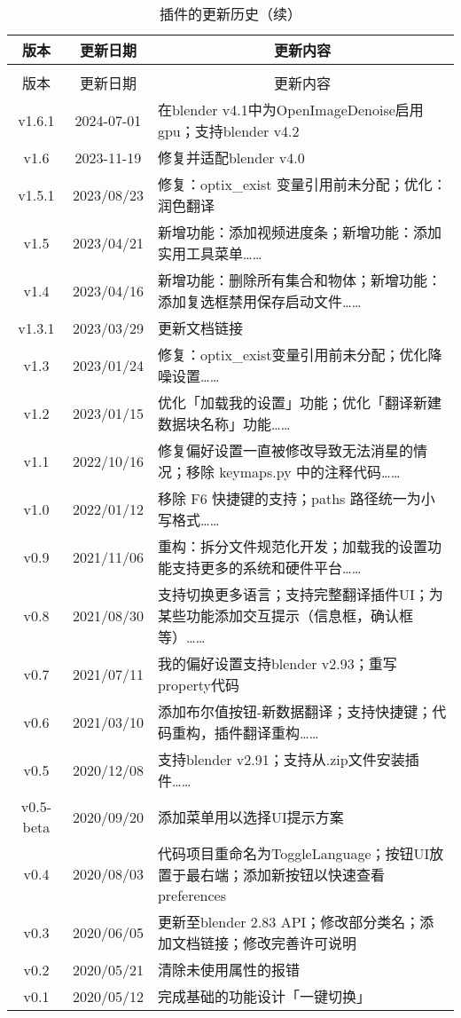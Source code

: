\documentclass{../../public_resources/doc}
\begin{document}
\begin{longtable}{|*{2}{c|}m{300pt}|}
    \caption{插件的更新历史}\label{更新历史} \\
    \hline
    版本 & 更新日期 & \multicolumn{1}{c|}{更新内容} \\
    \hline
    \endfirsthead

    \caption{插件的更新历史（续）} \\
    \hline
    版本 & 更新日期 & \multicolumn{1}{c|}{更新内容} \\
    \hline
    \endhead

    v1.6.1 & 2024-07-01 & 在blender v4.1中为OpenImageDenoise启用gpu；支持blender v4.2\\
    \hline
    v1.6 & 2023-11-19 & 修复并适配blender v4.0 \\
    \hline
    v1.5.1 & 2023/08/23 & 修复：optix\_exist 变量引用前未分配；优化：润色翻译 \\
    \hline
    v1.5 & 2023/04/21 & 新增功能：添加视频进度条；新增功能：添加实用工具菜单…… \\
    \hline
    v1.4 & 2023/04/16 & 新增功能：删除所有集合和物体；新增功能：添加复选框禁用保存启动文件……\\
    \hline
    v1.3.1 & 2023/03/29 & 更新文档链接 \\
    \hline
    v1.3 & 2023/01/24 & 修复：optix\_exist变量引用前未分配；优化降噪设置……\\
    \hline
    v1.2 & 2023/01/15 & 优化「加载我的设置」功能；优化「翻译新建数据块名称」功能…… \\
    \hline
    v1.1 & 2022/10/16 & 修复偏好设置一直被修改导致无法消星的情况；移除 keymaps.py 中的注释代码…… \\
    \hline
    v1.0 & 2022/01/12 & 移除 F6 快捷键的支持；paths 路径统一为小写格式…… \\
    \hline
    v0.9 & 2021/11/06 & 重构：拆分文件规范化开发；加载我的设置功能支持更多的系统和硬件平台……\\
    \hline
    v0.8 & 2021/08/30 & 支持切换更多语言；支持完整翻译插件UI；为某些功能添加交互提示（信息框，确认框等）…… \\
    \hline
    v0.7 & 2021/07/11 & 我的偏好设置支持blender v2.93；重写property代码 \\
    \hline
    v0.6 & 2021/03/10 & 添加布尔值按钮-新数据翻译；支持快捷键；代码重构，插件翻译重构…… \\
    \hline
    v0.5 & 2020/12/08 & 支持blender v2.91；支持从.zip文件安装插件…… \\
    \hline
    v0.5-beta & 2020/09/20 & 添加菜单用以选择UI提示方案 \\
    \hline
    v0.4 & 2020/08/03 & 代码项目重命名为ToggleLanguage；按钮UI放置于最右端；添加新按钮以快速查看preferences \\
    \hline
    v0.3 & 2020/06/05 & 更新至blender 2.83 API；修改部分类名；添加文档链接；修改完善许可说明 \\
    \hline
    v0.2 & 2020/05/21 & 清除未使用属性的报错 \\
    \hline
    v0.1 & 2020/05/12 & 完成基础的功能设计「一键切换」 \\
    \hline
\end{longtable}
\end{document}
